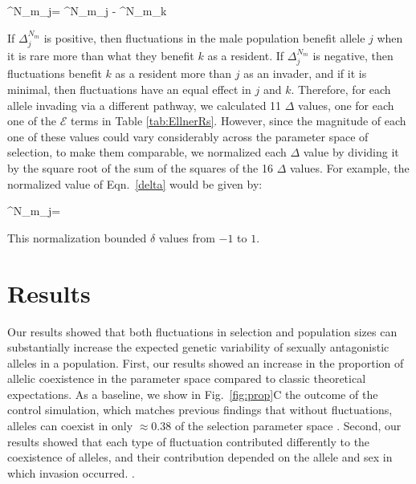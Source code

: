 \documentclass[12pt]{article}
\let\oldequation\equation
\let\oldendequation\endequation
\renewenvironment{equation}
  {\linenomathNonumbers\oldequation}
  {\oldendequation\endlinenomath}
\begin{document}
\begin{equation}
\Delta^{N_{m}}_{j}= ^{N_{m}}_{j} - ^{N_{m}}_{k}
\label{delta}
\end{equation}

If $\Delta^{N_{m}}_{j}$ is positive, then fluctuations in the male population benefit allele $j$ when it is rare more than what they benefit $k$ as a resident. If $\Delta^{N_{m}}_{j}$ is negative, then fluctuations benefit $k$ as a resident more than $j$ as an invader, and if it is minimal, then fluctuations have an equal effect in $j$ and $k$. Therefore, for each allele invading via a different pathway, we calculated 11 $\Delta$ values, one for each one of the $\mathcal{E}$ terms in Table \ref{tab:EllnerRs}. However, since the magnitude of each one of these values could vary considerably across the parameter space of selection, to make them comparable, we normalized each $\Delta$ value by dividing it by the square root of the sum of the squares of the 16 $\Delta$ values. For example, the normalized value of Eqn.~\ref{delta} would be given by:



\begin{equation}
  \delta^{N_{m}}_{j}= 
\end{equation}

This normalization bounded $\delta$ values from $-1$ to $1$.

\section{Results}

Our results showed that both fluctuations in selection and population sizes can substantially increase the expected genetic variability of sexually antagonistic alleles in a population. First, our results showed an increase in the proportion of allelic coexistence in the parameter space compared to classic theoretical expectations. As a baseline, we show in Fig.~\ref{fig:prop}C the outcome of the control simulation, which matches previous findings that without fluctuations, alleles can coexist in only $\approx 0.38$ of the selection parameter space \citep{connallon2018environmental}. Second, our results showed that each type of fluctuation contributed differently to the coexistence of alleles, and their contribution depended on the allele and sex in which invasion occurred.
.
\end{document}
